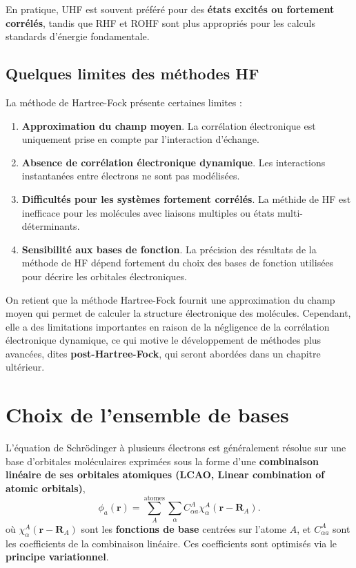 \documentclass[12pt,a4paper]{article} %
\numberwithin{equation}{section} %
\numberwithin{figure}{section} %
\numberwithin{table}{section} %
\begin{document}
En pratique, UHF est souvent préféré pour des \textbf{états excités ou fortement corrélés}, tandis que RHF et ROHF sont plus appropriés pour les calculs standards d'énergie fondamentale.

\subsection{Quelques limites des méthodes HF}

La méthode de Hartree-Fock présente certaines limites :
\begin{enumerate}
\item \textbf{Approximation du champ moyen}. La corrélation électronique est uniquement prise en compte par l’interaction d’échange.
\item \textbf{Absence de corrélation électronique dynamique}. Les interactions instantanées entre électrons ne sont pas modélisées.
    \item \textbf{Difficultés pour les systèmes fortement corrélés}. La méthide de HF est inefficace pour les molécules avec liaisons multiples ou états multi-déterminants.
\item \textbf{Sensibilité aux bases de fonction}. La précision des résultats de la méthode de HF dépend fortement du choix des bases de fonction utilisées pour décrire les orbitales électroniques.
\end{enumerate}

On retient que la méthode Hartree-Fock fournit une approximation du champ moyen qui permet de calculer la structure électronique des molécules. Cependant, elle a des limitations importantes en raison de la négligence de la corrélation électronique dynamique, ce qui motive le développement de méthodes plus avancées, dites \textbf{post-Hartree-Fock}, qui seront abordées dans un chapitre ultérieur.

\section{\label{sec:Base} Choix de l'ensemble de bases}

L'équation de Schrödinger à plusieurs électrons est généralement résolue sur une base d'orbitales moléculaires exprimées sous la forme d'une \textbf{combinaison linéaire de ses orbitales atomiques (LCAO, Linear combination of atomic orbitals)}, 
\begin{equation}
     \phi_a(\mathbf{r}) =
     \sum_A^\mathrm{atomes}
     \sum_\alpha C^A_{\alpha a}
     \chi^A_{\alpha}(\mathbf{r} - \mathbf{R}_A) .
\end{equation}
où $\chi^A_{\alpha}(\mathbf{r} - \mathbf{R}_A)$ sont les \textbf{fonctions de base} centrées sur l’atome $A$, et $C^A_{\alpha a}$ sont les coefficients de la combinaison linéaire. Ces coefficients sont optimisés via le \textbf{principe variationnel}.
\end{document}
